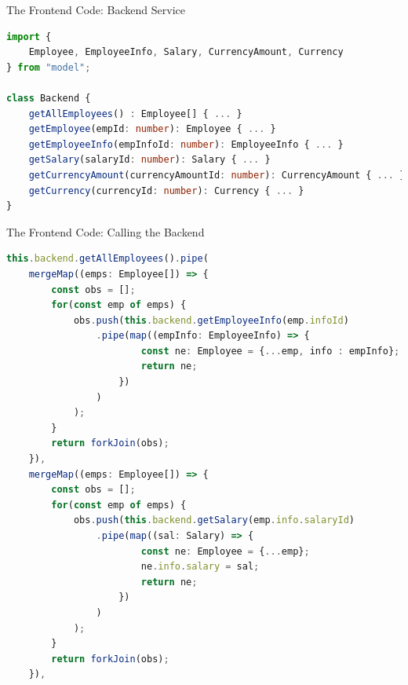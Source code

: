 \documentclass[aspectratio=169,notes]{beamer}
\begin{document}
	\begin{frame}[fragile]{The Frontend Code: Backend Service}
\begin{lstlisting}[language=TypeScript,basicstyle=\scriptsize\ttfamily,tabsize=4]
import { 
	Employee, EmployeeInfo, Salary, CurrencyAmount, Currency 
} from "model";

class Backend {
	getAllEmployees() : Employee[] { ... }
	getEmployee(empId: number): Employee { ... }
	getEmployeeInfo(empInfoId: number): EmployeeInfo { ... }
	getSalary(salaryId: number): Salary { ... }
	getCurrencyAmount(currencyAmountId: number): CurrencyAmount { ... }
	getCurrency(currencyId: number): Currency { ... }
}
\end{lstlisting}
	\end{frame}

	\begin{frame}[fragile]{The Frontend Code: Calling the Backend}
\begin{lstlisting}[language=TypeScript,basicstyle=\scriptsize\ttfamily,tabsize=2]
this.backend.getAllEmployees().pipe(
	mergeMap((emps: Employee[]) => {
		const obs = [];
		for(const emp of emps) {
			obs.push(this.backend.getEmployeeInfo(emp.infoId)
				.pipe(map((empInfo: EmployeeInfo) => {
						const ne: Employee = {...emp, info : empInfo};
						return ne;
					})
				)
			);
		}
		return forkJoin(obs);
	}),
	mergeMap((emps: Employee[]) => {
		const obs = [];
		for(const emp of emps) {
			obs.push(this.backend.getSalary(emp.info.salaryId)
				.pipe(map((sal: Salary) => {
						const ne: Employee = {...emp};
						ne.info.salary = sal;
						return ne;
					})
				)
			);
		}
		return forkJoin(obs);
	}),
\end{lstlisting}
\end{frame}
\end{document}
